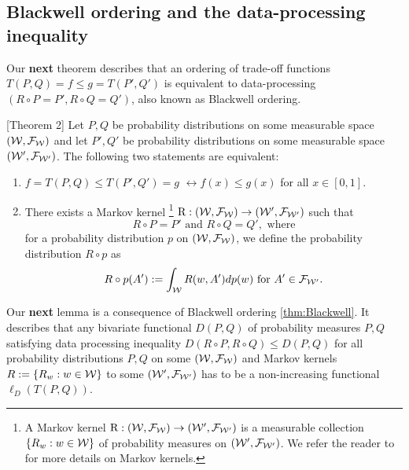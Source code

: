 \subsection{Blackwell ordering and the data-processing inequality}
Our \textbf{next} theorem describes  that an ordering of trade-off functions $T(P,Q)=f \leq g =T(P',Q')$ is equivalent to data-processing $(R\circ P= P', R\circ Q= Q')$, also known as Blackwell ordering.
\begin{theorem}  \citet{dong2022gaussian}[Theorem 2] \label{thm:Blackwell}
Let \(P,Q\) be probability distributions on some measurable space $(\mathcal{W}, \mathcal{F}_{\mathcal{W}})$ and let
\(P',Q'\) be probability distributions on some measurable space $(\mathcal{W}', \mathcal{F}_{\mathcal{W}'})$. The following
two statements are equivalent:
\begin{enumerate}
    \item \(f=T(P,Q) \leq T(P',Q')=g\) $\leftrightarrow f(x) \leq g(x)$  for all $x\in [0,1]$.
    \item There exists a Markov kernel \footnote{A Markov kernel  $\mathrm{R}: (\mathcal{W}, \mathcal{F}_{\mathcal{W}})  \to (\mathcal{W}', \mathcal{F}_{\mathcal{W}'})$ is a measurable collection $\{R_w:w\in \mathcal{W}\}$ of probability measures on $(\mathcal{W}', \mathcal{F}_{\mathcal{W}'})$. We refer the reader to \cite{kallenberg2021foundations}  for more details on Markov kernels.}
        $\mathrm{R}: (\mathcal{W}, \mathcal{F}_{\mathcal{W}})  \to (\mathcal{W}', \mathcal{F}_{\mathcal{W}'})$
    such that
    \[
        R \circ P=P' \text{ and }
        R \circ Q=Q',  \text{ where}
    \]
   for a probability distribution  $p$ on  $(\mathcal{W}, \mathcal{F}_{\mathcal{W}})$, we define the probability distribution $R\circ p$ as   
    \begin{equation}  \label{eq:MKDef}
    R\circ p(A'):= \int_{\mathcal{W}} R(w, A') dp(w)    \text{ for } A' \in \mathcal{F}_{\mathcal{W}'}.
    \end{equation}
\end{enumerate}
\end{theorem}
Our \textbf{next} lemma is a consequence of Blackwell ordering \ref{thm:Blackwell}. It describes that any bivariate functional $D(P,Q)$ of probability measures $P,Q$ satisfying data processing inequality $D(R\circ P, R \circ Q) \leq D(P,Q)$ for all probability distributions $P,Q$ on some $(\mathcal{W}, \mathcal{F}_{\mathcal{W}})$ and Markov kernels $R:=\{R_w:w \in \mathcal{W}\}$ to some $(\mathcal{W}', \mathcal{F}_{\mathcal{W}'})$ has to be a non-increasing functional $\ell_D(T(P,Q))$.

